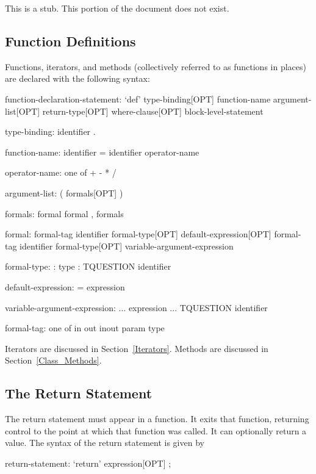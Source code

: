 \label{Functions}

This is a stub.  This portion of the document does not exist.

\subsection{Function Definitions}
\label{Function_Definitions}

Functions, iterators, and methods (collectively referred to as
functions in places) are declared with the following syntax:
\begin{syntax}
function-declaration-statement:
  `def' type-binding[OPT] function-name argument-list[OPT]
    return-type[OPT] where-clause[OPT] block-level-statement

type-binding:
  identifier .

function-name:
  identifier
  = identifier
  operator-name

operator-name: one of
  + - * / %

argument-list:
  ( formals[OPT] )

formals:
  formal
  formal , formals

formal:
  formal-tag identifier formal-type[OPT] default-expression[OPT]
  formal-tag identifier formal-type[OPT] variable-argument-expression

formal-type:
  : type
  : TQUESTION identifier

default-expression:
  = expression

variable-argument-expression:
  ... expression
  ... TQUESTION identifier

formal-tag: one of
  in out inout param type
\end{syntax}
Iterators are discussed in Section~\ref{Iterators}.  Methods are
discussed in Section~\ref{Class_Methods}.

\subsection{The Return Statement}
\label{The_Return_Statement}

The return statement must appear in a function.  It exits that
function, returning control to the point at which that function was
called.  It can optionally return a value.  The syntax of the return
statement is given by
\begin{syntax}
return-statement:
  `return' expression[OPT] ;
\end{syntax}


